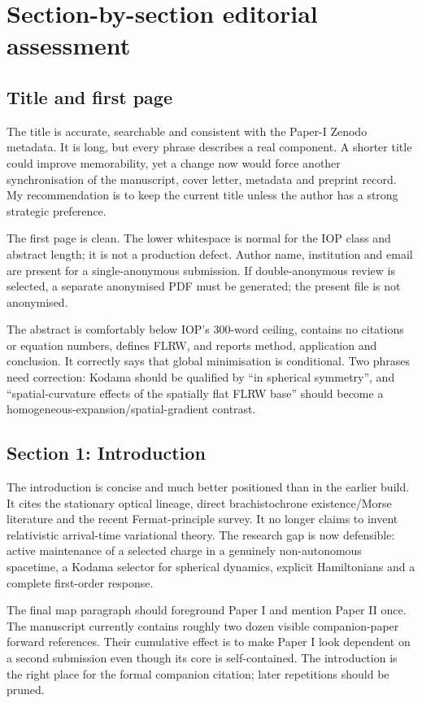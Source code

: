 \documentclass[11pt,a4paper]{article}
\begin{document}
\clearpage
\section{Section-by-section editorial assessment}

\subsection{Title and first page}

The title is accurate, searchable and consistent with the Paper-I Zenodo metadata. It is long,
but every phrase describes a real component. A shorter title could improve memorability, yet a
change now would force another synchronisation of the manuscript, cover letter, metadata and
preprint record. My recommendation is to keep the current title unless the author has a strong
strategic preference.

The first page is clean. The lower whitespace is normal for the IOP class and abstract length;
it is not a production defect. Author name, institution and email are present for a
single-anonymous submission. If double-anonymous review is selected, a separate anonymised PDF
must be generated; the present file is not anonymised.

The abstract is comfortably below IOP's 300-word ceiling, contains no citations or equation
numbers, defines FLRW, and reports method, application and conclusion. It correctly says that
global minimisation is conditional. Two phrases need correction: Kodama should be qualified by
``in spherical symmetry'', and ``spatial-curvature effects of the spatially flat FLRW base''
should become a homogeneous-expansion/spatial-gradient contrast.

\subsection{Section 1: Introduction}

The introduction is concise and much better positioned than in the earlier build. It cites the
stationary optical lineage, direct brachistochrone existence/Morse literature and the recent
Fermat-principle survey. It no longer claims to invent relativistic arrival-time variational
theory. The research gap is now defensible: active maintenance of a selected charge in a
genuinely non-autonomous spacetime, a Kodama selector for spherical dynamics, explicit
Hamiltonians and a complete first-order response.

The final map paragraph should foreground Paper I and mention Paper II once. The manuscript
currently contains roughly two dozen visible companion-paper forward references. Their
cumulative effect is to make Paper I look dependent on a second submission even though its
core is self-contained. The introduction is the right place for the formal companion citation;
later repetitions should be pruned.
\end{document}

